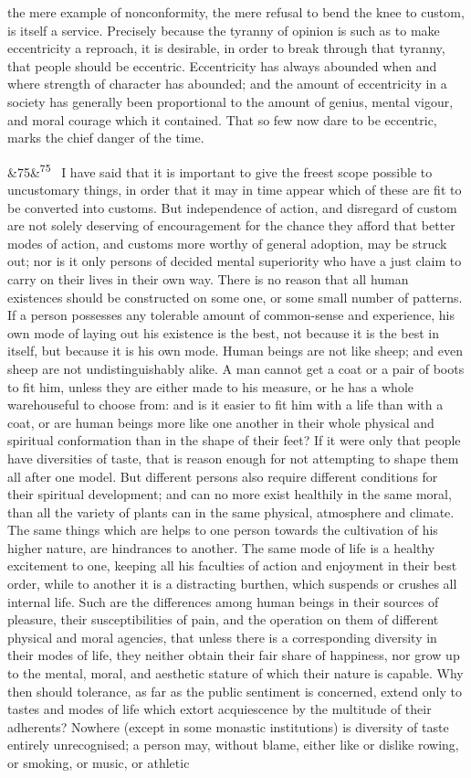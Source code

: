 \documentclass[12pt]{article}
\newcommand{\para}[1][]{\par\noindent\ifx&#1&\else\textsuperscript{\footnotesize #1}~\fi}
\begin{document}
the mere example of nonconformity, the mere refusal to bend the knee to custom, is itself a service. Precisely because the tyranny of opinion is such as to make eccentricity a reproach, it is desirable, in order to break through that tyranny, that people should be eccentric. Eccentricity has always abounded when and where strength of character has abounded; and the amount of eccentricity in a society has generally been proportional to the amount of genius, mental vigour, and moral courage which it contained. That so few now dare to be eccentric, marks the chief danger of the time.

\para[75] I have said that it is important to give the freest scope possible to uncustomary things, in order that it may in time appear which of these are fit to be converted into customs. But independence of action, and disregard of custom are not solely deserving of encouragement for the chance they afford that better modes of action, and customs more worthy of general adoption, may be struck out; nor is it only persons of decided mental superiority who have a just claim to carry on their lives in their own way. There is no reason that all human existences should be constructed on some one, or some small number of patterns. If a person possesses any tolerable amount of common-sense and experience, his own mode of laying out his existence is the best, not because it is the best in itself, but because it is his own mode. Human beings are not like sheep; and even sheep are not undistinguishably alike. A man cannot get a coat or a pair of boots to fit him, unless they are either made to his measure, or he has a whole warehouseful to choose from: and is it easier to fit him with a life than with a coat, or are human beings more like one another in their whole physical and spiritual conformation than in the shape of their feet? If it were only that people have diversities of taste, that is reason enough for not attempting to shape them all after one model. But different persons also require different conditions for their spiritual development; and can no more exist healthily in the same moral, than all the variety of plants can in the same physical, atmosphere and climate. The same things which are helps to one person towards the cultivation of his higher nature, are hindrances to another. The same mode of life is a healthy excitement to one, keeping all his faculties of action and enjoyment in their best order, while to another it is a distracting burthen, which suspends or crushes all internal life. Such are the differences among human beings in their sources of pleasure, their susceptibilities of pain, and the operation on them of different physical and moral agencies, that unless there is a corresponding diversity in their modes of life, they neither obtain their fair share of happiness, nor grow up to the mental, moral, and aesthetic stature of which their nature is capable. Why then should tolerance, as far as the public sentiment is concerned, extend only to tastes and modes of life which extort acquiescence by the multitude of their adherents? Nowhere (except in some monastic institutions) is diversity of taste entirely unrecognised; a person may, without blame, either like or dislike rowing, or smoking, or music, or athletic 
\end{document}
